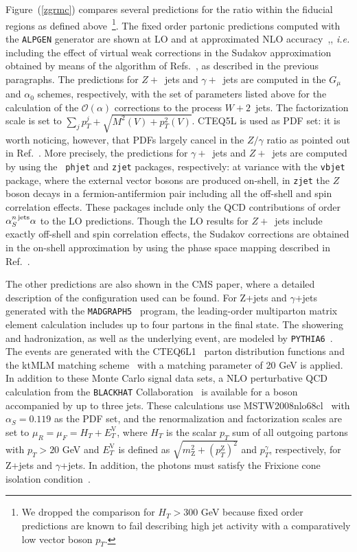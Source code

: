 \documentclass[11pt]{cernrep} \usepackage{graphicx,epsfig} 
\begin{document}
Figure~(\ref{zgrmc}) compares several predictions for the ratio within the fiducial regions as defined above~\footnote{We dropped
the comparison for $H_T>300$ GeV because fixed order predictions are known to fail describing high jet activity with a
comparatively low vector boson $p_T$.}. The fixed
order partonic predictions computed with the {\tt ALPGEN} generator are shown at LO and at 
approximated NLO accuracy~\cite{Chiesa:2013yma},, \emph{i.e.} including the effect of virtual weak corrections in the Sudakov approximation obtained by
means of the algorithm of Refs.~\cite{Denner:2000jv,Denner:2001gw}, as described in the previous paragraphs. The
predictions for $Z+$~jets and $\gamma+$~jets are computed in the $G_{\mu}$ and $\alpha_0$ schemes, respectively, with
the set of parameters listed above for the calculation of the $\mathcal{O}(\alpha)$ corrections to the process
$W+2$~jets. The factorization scale is set to $\sum_j p_T^j +\sqrt{M^2(V) +p^2_T(V)}$. CTEQ5L is used as
PDF set: it is worth noticing, however, that PDFs largely cancel in the $Z/\gamma$ ratio as pointed out in
Ref.~\cite{Ask:2011xf}.  More precisely, the predictions for $\gamma+$~jets and $Z+$~jets are computed by using the {\tt
phjet} and {\tt zjet} packages, respectively: at variance with the {\tt vbjet} package, where the external vector bosons
are produced on-shell, in {\tt zjet} the $Z$ boson decays in a fermion-antifermion pair including all the off-shell and
spin correlation effects. These packages include only the QCD contributions of order $\alpha_S^{n \, {\rm jets}} \alpha$
to the LO predictions. Though the LO results for $Z+$~jets include exactly off-shell and spin correlation effects, the
Sudakov corrections are obtained in the on-shell approximation by using the phase space mapping described in
Ref.~\cite{Denner:2014ina}.

The other predictions are also shown in the CMS paper, where a detailed description of the configuration used can be
found. For Z+jets and $\gamma$+jets generated with the {\tt MADGRAPH5}~\cite{MadGraph5} program, the leading-order
multiparton matrix element calculation includes up to four partons in the final state. The
showering and hadronization, as well as the underlying event, are modeled by {\tt PYTHIA6}~\cite{pythia6}. The events
are generated with the CTEQ6L1~\cite{CTEQ6} parton distribution functions and the ktMLM
matching scheme~\cite{MatchingPaper} with a matching parameter of 20 GeV is applied.  
In addition to these Monte Carlo signal data sets, a NLO perturbative QCD calculation from the
{\tt BLACKHAT} Collaboration~\cite{BlackHat} is available for a boson accompanied by up to three jets. These
calculations use MSTW2008nlo68cl~\cite{MSTW} with $\alpha_{S}=0.119$ as the PDF set, and the renormalization and
factorization scales are set to $\mu_{R}=\mu_{F}=H_T+E_T^{\mathrm{V}}$, where $H_T$ is the scalar $p_T$ sum of all
outgoing partons with $p_T>20$ GeV and $E_T^{\mathrm{V}}$ is defined as
$\sqrt{m_{\mathrm{Z}}^{2}+\left(p_T^{\mathrm{Z}}\right)^{2}}$ and $p_T^{\gamma}$, respectively, for Z+jets and $\gamma$+jets.
In addition, the photons must satisfy the Frixione cone isolation condition~\cite{Frixione}.
\end{document}
